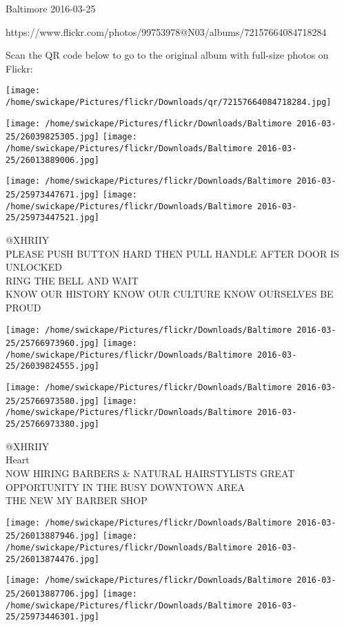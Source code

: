 \documentclass[10pt,letterpaper]{article}
\begin{document}
Baltimore 2016-03-25

https://www.flickr.com/photos/99753978@N03/albums/72157664084718284

Scan the QR code below to go to the original album with full-size photos on Flickr:

\texttt{[image: /home/swickape/Pictures/flickr/Downloads/qr/72157664084718284.jpg]}
\pagebreak

\texttt{[image: /home/swickape/Pictures/flickr/Downloads/Baltimore 2016-03-25/26039825305.jpg]}
\texttt{[image: /home/swickape/Pictures/flickr/Downloads/Baltimore 2016-03-25/26013889006.jpg]}

\texttt{[image: /home/swickape/Pictures/flickr/Downloads/Baltimore 2016-03-25/25973447671.jpg]}
\texttt{[image: /home/swickape/Pictures/flickr/Downloads/Baltimore 2016-03-25/25973447521.jpg]}

@XHRIIY\\
PLEASE PUSH BUTTON HARD THEN PULL HANDLE AFTER DOOR IS UNLOCKED\\
RING THE BELL AND WAIT\\
KNOW OUR HISTORY KNOW OUR CULTURE KNOW OURSELVES BE PROUD\\
\pagebreak

\texttt{[image: /home/swickape/Pictures/flickr/Downloads/Baltimore 2016-03-25/25766973960.jpg]}
\texttt{[image: /home/swickape/Pictures/flickr/Downloads/Baltimore 2016-03-25/26039824555.jpg]}

\texttt{[image: /home/swickape/Pictures/flickr/Downloads/Baltimore 2016-03-25/25766973580.jpg]}
\texttt{[image: /home/swickape/Pictures/flickr/Downloads/Baltimore 2016-03-25/25766973380.jpg]}

@XHRIIY\\
Heart\\
NOW HIRING BARBERS \& NATURAL HAIRSTYLISTS GREAT OPPORTUNITY IN THE BUSY DOWNTOWN AREA\\
THE NEW MY BARBER SHOP\\
\pagebreak

\texttt{[image: /home/swickape/Pictures/flickr/Downloads/Baltimore 2016-03-25/26013887946.jpg]}
\texttt{[image: /home/swickape/Pictures/flickr/Downloads/Baltimore 2016-03-25/26013874476.jpg]}

\texttt{[image: /home/swickape/Pictures/flickr/Downloads/Baltimore 2016-03-25/26013887706.jpg]}
\texttt{[image: /home/swickape/Pictures/flickr/Downloads/Baltimore 2016-03-25/25973446301.jpg]}
\end{document}
